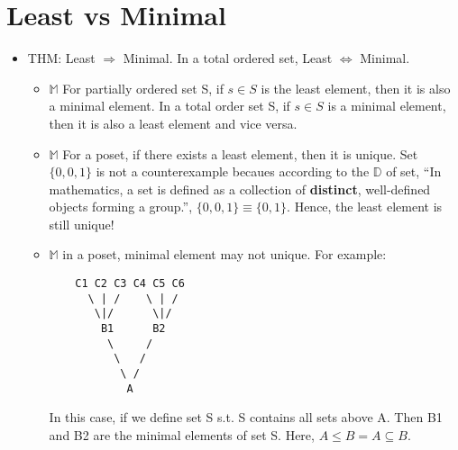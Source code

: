 \documentclass[11pt]{article}
\begin{document}
\section{Least vs Minimal}
\label{sec:org82a1b46}
\begin{itemize}
\item THM: Least \(\Rightarrow\) Minimal. In a total ordered set, Least \(\Leftrightarrow\) Minimal.
\begin{itemize}
\item \(\mathbb{M}\) For partially ordered set S, if \(s \in S\) is the least element, then it is also a minimal element. In a total order set S, if \(s \in S\) is a minimal element, then it is also a least element and vice versa.
\item \(\mathbb{M}\) For a poset, if there exists a least element, then it is unique. Set \(\{0, 0, 1\}\) is not a counterexample becaues according to the \(\mathbb{D}\) of set, ``In mathematics, a set is defined as a collection of \textbf{distinct}, well-defined objects forming a group.'', \(\{0, 0, 1\} \equiv \{0, 1\}\). Hence, the least element is still unique!
\item \(\mathbb{M}\) in a poset, minimal element may not unique. For example:\\[0pt]
\begin{verbatim}
    C1 C2 C3 C4 C5 C6
      \ | /    \ | /
       \|/      \|/
        B1      B2
         \     /
          \   /
           \ /
            A
\end{verbatim}
In this case, if we define set S s.t. S contains all sets above A. Then B1 and B2 are the minimal elements of set S. Here, \(A \leq B = A \subseteq B\).
\end{itemize}
\end{itemize}
\end{document}
